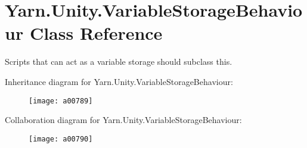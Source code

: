\hypertarget{a00191}{\section{Yarn.\-Unity.\-Variable\-Storage\-Behaviour Class Reference}
\label{a00191}
}


Scripts that can act as a variable storage should subclass this.  




Inheritance diagram for Yarn.\-Unity.\-Variable\-Storage\-Behaviour\-:
\nopagebreak
\begin{figure}[H]
\begin{center}
\leavevmode
\texttt{[image: a00789]}
\end{center}
\end{figure}


Collaboration diagram for Yarn.\-Unity.\-Variable\-Storage\-Behaviour\-:
\nopagebreak
\begin{figure}[H]
\begin{center}
\leavevmode
\texttt{[image: a00790]}
\end{center}
\end{figure}
